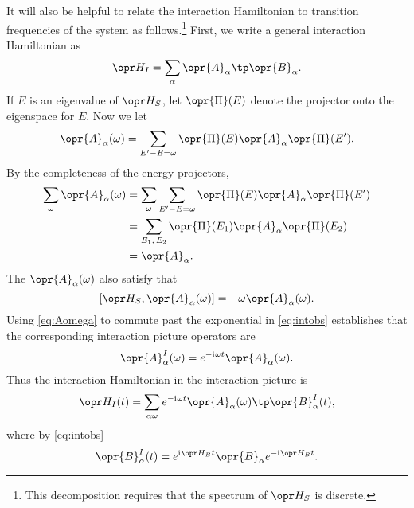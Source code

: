 \documentclass[../thesis.tex]{subfiles}
\begin{document}
It will also be helpful to relate the interaction Hamiltonian to transition
frequencies of the system as follows.\footnote{%
  This decomposition requires that the spectrum of $\ham_S$ is discrete.
}
First, we write a general interaction Hamiltonian as
\begin{equation}
  \ham_I
  = \sum_\alpha \opr{A}_\alpha \tp \opr{B}_\alpha.
\end{equation}
If $E$ is an eigenvalue of $\ham_S$, let $\opr{\Pi}(E)$ denote the projector
onto the eigenspace for $E$. Now we let
\begin{equation}
  \opr{A}_{\alpha}(\omega)
  = \sum_{E' - E = \omega} \opr{\Pi}(E)\opr{A}_\alpha\opr{\Pi}(E').
  \label{eq:Aprojectors}
\end{equation}
By the completeness of the energy projectors,
\begin{align}
  \sum_\omega \opr{A}_\alpha(\omega)
  &= \sum_\omega
  \sum_{E' - E = \omega} \opr{\Pi}(E)\opr{A}_\alpha\opr{\Pi}(E') \\
  &= \sum_{E_1,\, E_2}
  \opr{\Pi}(E_1)\opr{A}_\alpha\opr{\Pi}(E_2) \\
  &= \opr{A}_\alpha.
\end{align}
The $\opr{A}_\alpha(\omega)$ also satisfy that
\begin{equation}
  \comm{\ham_S}{\opr{A}_{\alpha}(\omega)}
  = -\omega\opr{A}_{\alpha}(\omega).
  \label{eq:Aomega}
\end{equation}
Using \cref{eq:Aomega} to commute past the exponential in \cref{eq:intobs}
establishes that the corresponding interaction picture operators are
\begin{equation}
  \opr{A}_\alpha^I(\omega)
  = e^{-\im\omega t} \opr{A}_{\alpha}(\omega).
\end{equation}
Thus the interaction Hamiltonian in the interaction picture is
\begin{equation}
  \ham_I(t)
  = \sum_{\alpha\omega} e^{-\im\omega t} \opr{A}_{\alpha}(\omega)
  \tp \opr{B}_\alpha^I(t),
  \label{eq:inthamdecomp}
\end{equation}
where by \cref{eq:intobs}
\begin{equation}
  \opr{B}_\alpha^I(t)
  = e^{\im\ham_B t} \opr{B}_\alpha e^{-\im\ham_B t}.
\end{equation}
\end{document}
